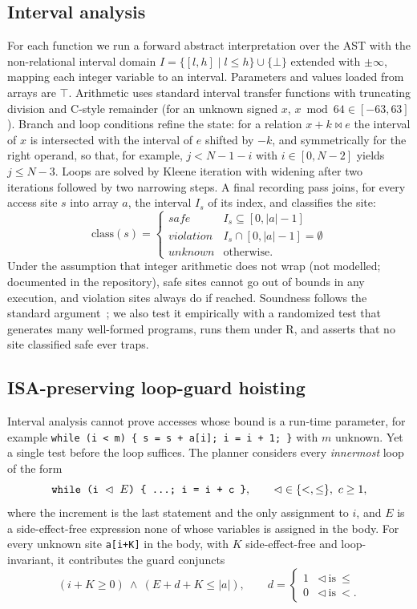 \documentclass[11pt,a4paper]{article}
\begin{document}
\subsection{Interval analysis}
For each function we run a forward abstract interpretation over the AST with the non-relational interval domain $I=\{[l,h]\mid l\le h\}\cup\{\bot\}$ extended with $\pm\infty$, mapping each integer variable to an interval. Parameters and values loaded from arrays are $\top$. Arithmetic uses standard interval transfer functions with truncating division and C-style remainder (for an unknown signed $x$, $x\bmod 64\in[-63,63]$). Branch and loop conditions refine the state: for a relation $x+k \bowtie e$ the interval of $x$ is intersected with the interval of $e$ shifted by $-k$, and symmetrically for the right operand, so that, for example, $j<N-1-i$ with $i\in[0,N-2]$ yields $j\le N-3$. Loops are solved by Kleene iteration with widening after two iterations followed by two narrowing steps. A final recording pass joins, for every access site $s$ into array $a$, the interval $I_s$ of its index, and classifies the site:
\[
\mathrm{class}(s)=\begin{cases}
\textit{safe} & I_s\subseteq[0,|a|-1]\\
\textit{violation} & I_s\cap[0,|a|-1]=\emptyset\\
\textit{unknown} & \text{otherwise.}
\end{cases}
\]
Under the assumption that integer arithmetic does not wrap (not modelled; documented in the repository), safe sites cannot go out of bounds in any execution, and violation sites always do if reached. Soundness follows the standard argument~\cite{cousot1977}; we also test it empirically with a randomized test that generates many well-formed programs, runs them under R, and asserts that no site classified safe ever traps.

\subsection{ISA-preserving loop-guard hoisting}\label{sec:hoist}
Interval analysis cannot prove accesses whose bound is a run-time parameter, for example \texttt{while (i < m) \{ s = s + a[i]; i = i + 1; \}} with $m$ unknown. Yet a single test before the loop suffices. The planner considers every \emph{innermost} loop of the form
\begin{equation}
\texttt{while (i}\ \lhd\ E\texttt{) \{ \dots; i = i + c \}},\qquad \lhd\in\{<,\le\},\ c\ge 1,\label{eq:loop}
\end{equation}
where the increment is the last statement and the only assignment to $i$, and $E$ is a side-effect-free expression none of whose variables is assigned in the body. For every unknown site \texttt{a[i+K]} in the body, with $K$ side-effect-free and loop-invariant, it contributes the guard conjuncts
\begin{equation}
(i+K\ge 0)\ \wedge\ (E+d+K\le |a|),\qquad d=\begin{cases}1&\lhd\ \text{is}\ \le\\0&\lhd\ \text{is}\ <.\end{cases}\label{eq:guard}
\end{equation}
\end{document}
